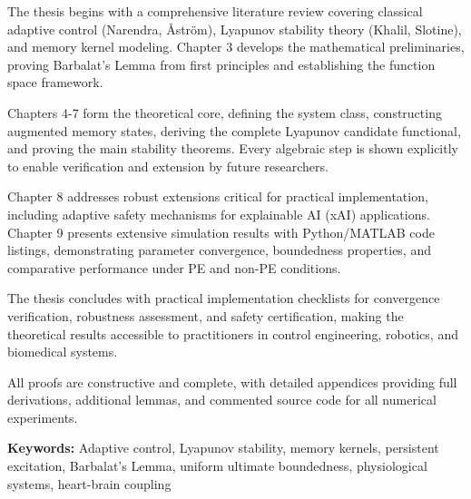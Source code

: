 The thesis begins with a comprehensive literature review covering classical adaptive control (Narendra, Åström), Lyapunov stability theory (Khalil, Slotine), and memory kernel modeling. Chapter 3 develops the mathematical preliminaries, proving Barbalat's Lemma from first principles and establishing the function space framework.

Chapters 4-7 form the theoretical core, defining the system class, constructing augmented memory states, deriving the complete Lyapunov candidate functional, and proving the main stability theorems. Every algebraic step is shown explicitly to enable verification and extension by future researchers.

Chapter 8 addresses robust extensions critical for practical implementation, including adaptive safety mechanisms for explainable AI (xAI) applications. Chapter 9 presents extensive simulation results with Python/MATLAB code listings, demonstrating parameter convergence, boundedness properties, and comparative performance under PE and non-PE conditions.

The thesis concludes with practical implementation checklists for convergence verification, robustness assessment, and safety certification, making the theoretical results accessible to practitioners in control engineering, robotics, and biomedical systems.

All proofs are constructive and complete, with detailed appendices providing full derivations, additional lemmas, and commented source code for all numerical experiments.

\vspace{1cm}

\noindent\textbf{Keywords:} Adaptive control, Lyapunov stability, memory kernels, persistent excitation, Barbalat's Lemma, uniform ultimate boundedness, physiological systems, heart-brain coupling
